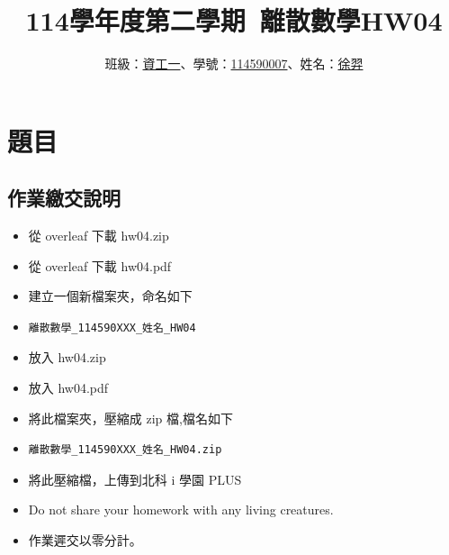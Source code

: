 \documentclass[sigconf]{acmart}
\begin{document}
\title{114學年度第二學期~離散數學HW04}

\author{班級：\underline{資工一}、學號：\underline{114590007}、姓名：\underline{徐羿}}
\orcid{}
\affiliation{%
  \institution{}
  \city{}
  \country{}
}

\renewcommand\footnotetextcopyrightpermission[1]{} %
\pagestyle{plain} %

\maketitle

\section{題目}
\subsection{作業繳交說明}
\begin{shaded}
\begin{itemize}
    \item[-] 從 overleaf 下載 hw04.zip
    \item[-] 從 overleaf 下載 hw04.pdf
    \item[-] 建立一個新檔案夾，命名如下
    \item[-] \color{red}\begin{verbatim}離散數學_114590XXX_姓名_HW04\end{verbatim}
    \item[-] \color{black}放入 hw04.zip
    \item[-] 放入 hw04.pdf
    \item[-] 將此檔案夾，壓縮成 zip 檔,檔名如下
    \item[-] \color{red}\begin{verbatim}離散數學_114590XXX_姓名_HW04.zip\end{verbatim}
    \item[-] \color{black}將此壓縮檔，上傳到北科 i 學園 PLUS
    \item[-] Do not share your homework with any living creatures.
    \item[-] 作業遲交以零分計。
\end{itemize}
\end{shaded}
\end{document}
